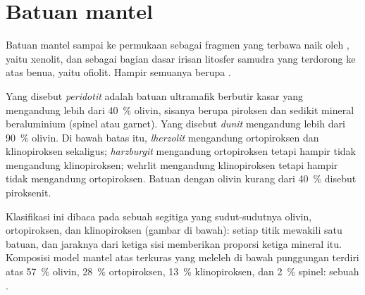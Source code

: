 \section{Batuan mantel}\label{sec:b2:mantle-melting:rock}

Batuan mantel sampai ke permukaan sebagai fragmen yang terbawa naik oleh ,
yaitu xenolit, dan sebagai bagian dasar irisan litosfer samudra yang terdorong ke atas
benua, yaitu ofiolit. Hampir semuanya berupa .

\begin{definition}\label{def:b2:mantle-melting:peridotites}
Yang disebut \emph{peridotit} adalah batuan ultramafik berbutir kasar
yang mengandung lebih dari \qty{40}{\percent} olivin, sisanya berupa piroksen dan
sedikit mineral beraluminium (spinel atau garnet). Yang disebut
\emph{dunit} mengandung lebih dari \qty{90}{\percent} olivin. Di bawah
batas itu, \emph{lherzolit} mengandung ortopiroksen dan
klinopiroksen sekaligus; \emph{harzburgit} mengandung ortopiroksen tetapi
hampir tidak mengandung klinopiroksen; wehrlit mengandung klinopiroksen tetapi hampir tidak mengandung
ortopiroksen. Batuan dengan olivin kurang dari \qty{40}{\percent} disebut piroksenit.
\end{definition}

Klasifikasi ini dibaca pada sebuah segitiga yang sudut-sudutnya olivin,
ortopiroksen, dan klinopiroksen (gambar di bawah): setiap titik mewakili satu batuan,
dan jaraknya dari ketiga sisi memberikan proporsi ketiga
mineral itu. Komposisi model mantel atas terkuras yang meleleh di bawah
punggungan terdiri atas \qty{57}{\percent} olivin,
\qty{28}{\percent} ortopiroksen, \qty{13}{\percent} klinopiroksen, dan
\qty{2}{\percent} spinel: sebuah .

